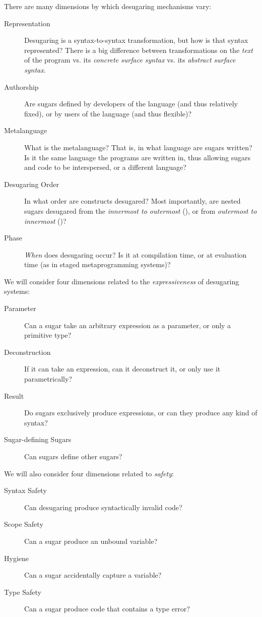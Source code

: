 There are many dimensions by which desugaring mechanisms vary:
\begin{description}
  \item[Representation] Desugaring is a syntax-to-syntax transformation, but
    how is that syntax represented? There is a big difference between
    transformations on the \emph{text} of the program vs. its
    \emph{concrete surface syntax} vs. its \emph{abstract surface
      syntax}.
  \item[Authorship] Are sugars defined by developers of the language (and thus
    relatively fixed), or by users of the language (and thus flexible)?
  \item[Metalanguage] What is the metalanguage? That is, in what language are sugars
    written? Is it the same language the programs are written in, thus
    allowing sugars and code to be interspersed, or a different
    language?
  \item[Desugaring Order] In what order are constructs desugared? Most
    importantly, are nested sugars desugared from the \emph{innermost
      to outermost} (), or from \emph{outermost to innermost}
    ()?
  \item[Phase] \emph{When} does desugaring occur? Is it at compilation time,
    or at evaluation time (as in staged metaprogramming systems)?
\end{description}
We will consider four dimensions related to the \emph{expressiveness}
of desugaring systems:
\begin{description}
  \item[Parameter] Can a sugar take an
    arbitrary expression as a parameter, or only a primitive type?
  \item[Deconstruction] If it can take an expression, can it
    deconstruct it, or only use it parametrically?
  \item[Result] Do sugars exclusively produce expressions, or can they
    produce any kind of syntax?
  \item[Sugar-defining Sugars] Can sugars define other sugars?
\end{description}
We will also consider four dimensions related to \emph{safety}:
\begin{description}
  \item[Syntax Safety] Can desugaring produce syntactically invalid
    code?
  \item[Scope Safety] Can a sugar produce an unbound variable?
  \item[Hygiene] Can a sugar accidentally capture a variable?
  \item[Type Safety] Can a sugar produce code that contains a type
    error?
\end{description}

